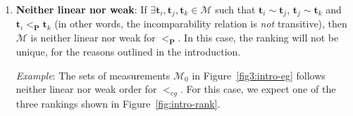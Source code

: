 \documentclass[acmsmall,screen, review]{acmart}
\begin{document}
\begin{enumerate}
	\item \textbf{Neither linear nor weak}: If $\exists \mathbf{t}_i, \mathbf{t}_j, \mathbf{t}_k \in \mathcal{M}$ such that $\mathbf{t}_i \sim \mathbf{t}_j$, $\mathbf{t}_j \sim \mathbf{t}_k$ and $\mathbf{t}_i <_{\mathbf{P}} \mathbf{t}_k$ (in  other words, the incomparability relation is \textit{not} transitive), then $\mathcal{M}$ is neither linear nor weak for $<_{\mathbf{P}} $. In this case, the ranking will not be unique, for the reasons outlined in the introduction.

	
	\textit{Example}: The sets of measurements $\mathcal{M}_0$ in Figure~\ref{fig3:intro-eg} follows neither linear nor weak order for $<_{eg}$. For this case, we expect one of the three rankings shown in Figure~\ref{fig:intro-rank}. 

\end{enumerate} 
\end{document}
